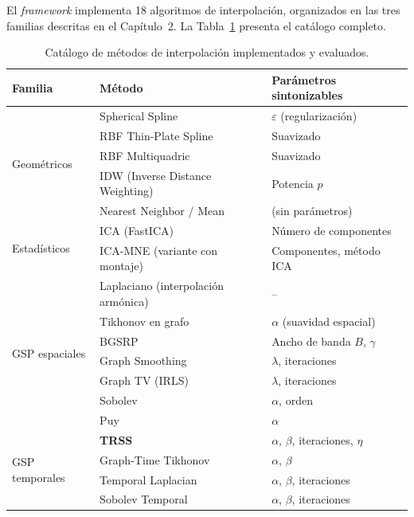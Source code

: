El \textit{framework} implementa 18 algoritmos de interpolación, organizados en las tres familias descritas en el Capítulo~2. La Tabla~\ref{tab:metodos_implementados} presenta el catálogo completo.

\begin{table}[ht]
\centering
\caption{Catálogo de métodos de interpolación implementados y evaluados.}
\label{tab:metodos_implementados}
\begin{tabular}{lll}
\toprule
\textbf{Familia} & \textbf{Método} & \textbf{Parámetros sintonizables} \\
\midrule
\multirow{5}{*}{Geométricos} 
    & Spherical Spline~\cite{perrin1989} & $\varepsilon$ (regularización) \\
    & RBF Thin-Plate Spline~\cite{jager_reconstruction_2016} & Suavizado \\
    & RBF Multiquadric & Suavizado \\
    & IDW (Inverse Distance Weighting) & Potencia $p$ \\
    & Nearest Neighbor / Mean & (sin parámetros) \\
\midrule
\multirow{2}{*}{Estadísticos}
    & ICA (FastICA)~\cite{hyvarinen2000independent} & Número de componentes \\
    & ICA-MNE (variante con montaje) & Componentes, método ICA \\
\midrule
\multirow{7}{*}{GSP espaciales}
    & Laplaciano (interpolación armónica) & -- \\
    & Tikhonov en grafo & $\alpha$ (suavidad espacial) \\
    & BGSRP~\cite{zhang_recovery_2024} & Ancho de banda $B$, $\gamma$ \\
    & Graph Smoothing & $\lambda$, iteraciones \\
    & Graph TV (IRLS) & $\lambda$, iteraciones \\
    & Sobolev & $\alpha$, orden \\
    & Puy~\cite{puy2018} & $\alpha$ \\
\midrule
\multirow{4}{*}{GSP temporales}
    & \textbf{TRSS}~\cite{giraldo2022} & $\alpha$, $\beta$, iteraciones, $\eta$ \\
    & Graph-Time Tikhonov & $\alpha$, $\beta$ \\
    & Temporal Laplacian & $\alpha$, $\beta$, iteraciones \\
    & Sobolev Temporal & $\alpha$, $\beta$, iteraciones \\
\bottomrule
\end{tabular}
\end{table}

